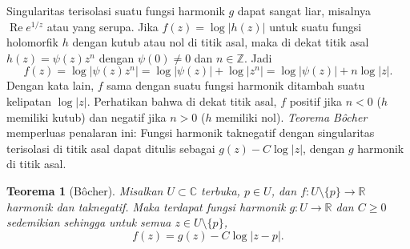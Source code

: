 \documentclass[12pt,openany]{book}
\renewcommand{\Re}{\operatorname{Re}}
\newcommand{\sabs}[1]{\lvert {#1} \rvert}
\newcommand{\abs}[1]{\left\lvert {#1} \right\rvert}
\newcommand{\C}{{\mathbb{C}}}
\newcommand{\R}{{\mathbb{R}}}
\newcommand{\Z}{{\mathbb{Z}}}
\theoremstyle{plain}
\newtheorem{thm}{Teorema}[section]
\theoremstyle{remark}
\theoremstyle{definition}
\theoremstyle{exercise}
\theoremstyle{example}
\begin{document}
Singularitas terisolasi suatu fungsi harmonik $g$ dapat sangat liar, misalnya
$\Re e^{1/z}$ atau yang serupa.  Jika $f(z) = \log \sabs{h(z)}$
untuk suatu fungsi holomorfik $h$ dengan kutub atau nol di titik asal,
maka di dekat titik asal $h(z) = \psi(z) z^n$ dengan $\psi(0)\not=0$ dan $n \in \Z$.
Jadi
\begin{equation*}
f(z) =
\log \sabs{\psi(z) z^n} = 
\log \sabs{\psi(z)} + \log \abs{z^n} = 
\log \sabs{\psi(z)} +
n \log \sabs{z} .
\end{equation*}
Dengan kata lain, $f$ sama dengan suatu fungsi harmonik ditambah suatu kelipatan $\log \sabs{z}$.
Perhatikan bahwa di dekat titik asal,
$f$ positif jika $n < 0$ ($h$ memiliki kutub) dan
negatif jika $n > 0$ ($h$ memiliki nol).
\emph{Teorema B\^{o}cher}
memperluas penalaran ini:
Fungsi harmonik taknegatif dengan singularitas terisolasi
di titik asal dapat ditulis sebagai
$g(z) - C \log \sabs{z}$, dengan $g$
harmonik di titik asal.

\begin{thm}[B\^{o}cher]
Misalkan $U \subset \C$ terbuka, $p \in U$, dan
$f \colon U \setminus \{ p \} \to \R$
harmonik dan taknegatif.  Maka terdapat fungsi harmonik
$g \colon U \to \R$ dan $C \geq 0$ sedemikian sehingga
untuk semua $z \in U \setminus \{ p \}$,
\begin{equation*}
f(z) = g(z) - C \log \sabs{z-p} .
\end{equation*}
\end{thm}
\end{document}

